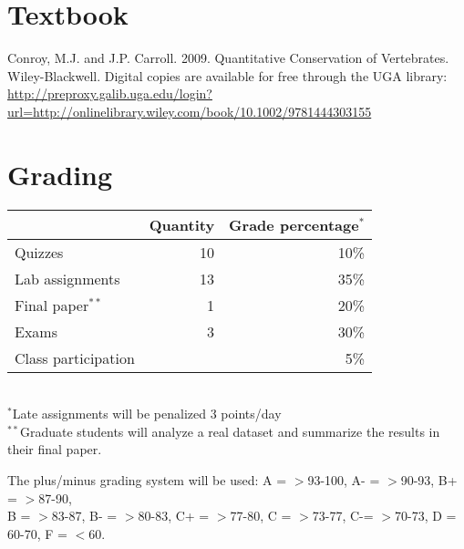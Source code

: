 \documentclass[12pt]{article}
\begin{document}
\vspace{-3mm}
\section*{\normalsize Textbook}
\vspace{-4mm}
Conroy, M.J. and J.P. Carroll. 2009. Quantitative Conservation of
Vertebrates. Wiley-Blackwell. Digital copies are available for free
through the UGA library: 
{\footnotesize \url{http://preproxy.galib.uga.edu/login?url=http://onlinelibrary.wiley.com/book/10.1002/9781444303155}}

\vspace{-3mm}
\section*{\normalsize Grading}
\vspace{-4mm}
\begin{center}
  \begin{tabular}[h!]{lrr}
    \hline
                        & Quantity & Grade percentage$^*$        \\
    \hline
    Quizzes             & 10       & 10\%                        \\
    Lab assignments     & 13       & 35\%                        \\
    Final paper$^{**}$  & 1        & 20\%                        \\
    Exams               & 3        & 30\%                        \\
    Class participation &          & 5\%                         \\
    \hline
  \end{tabular}                                                  \\
  \small
\hspace{0mm} $^*$Late assignments will be penalized 3 points/day \\ 
\hspace{0mm} $^{**}$Graduate students will analyze a real dataset and
summarize the results in their final paper.
\end{center}
\vspace{-6pt}
{%
The plus/minus grading system will be used: %
A = $>$93-100, A- = $>$90-93, B+ = $>$87-90,                     \\ B = $>$83-87,
B- = $>$80-83, C+ = $>$77-80, C = $>$73-77, C-= $>$70-73, D = 60-70, F = $<$60. 
}
\end{document}
